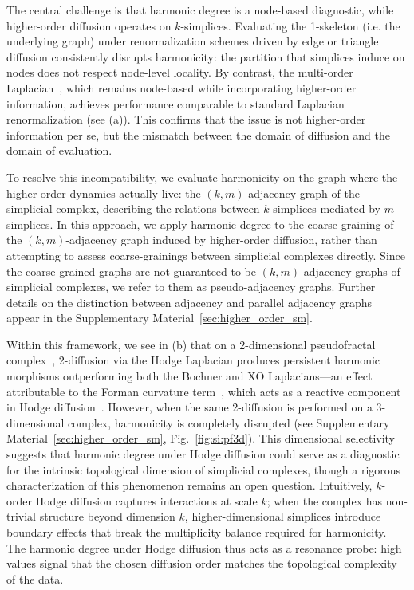 \documentclass[twocolumn,superscriptaddress,tightenlines,aps,prx,floatfix]{revtex4-2}
\begin{document}
\begin{bibunit}
The central challenge is that harmonic degree is a node-based diagnostic, while higher-order diffusion operates on $k$-simplices.
Evaluating the 1-skeleton (i.e. the underlying graph) under renormalization schemes driven by edge or triangle diffusion consistently disrupts harmonicity: the partition that simplices induce on nodes does not respect node-level locality.
By contrast, the multi-order Laplacian~\cite{Lucas_2020}, which remains node-based while incorporating higher-order information, achieves performance comparable to standard Laplacian renormalization (see (a)).
This confirms that the issue is not higher-order information per se, but the mismatch between the domain of diffusion and the domain of evaluation.

To resolve this incompatibility, we evaluate harmonicity on the graph where the higher-order dynamics actually live: the $(k,m)$-adjacency graph of the simplicial complex, describing the relations between $k$-simplices mediated by $m$-simplices.
In this approach, we apply harmonic degree to the coarse-graining of the $(k,m)$-adjacency graph induced by higher-order diffusion, rather than attempting to assess coarse-grainings between simplicial complexes directly.
Since the coarse-grained graphs are not guaranteed to be $(k,m)$-adjacency graphs of simplicial complexes, we refer to them as pseudo-adjacency graphs.
Further details on the distinction between adjacency and parallel adjacency graphs appear in the Supplementary Material~\ref{sec:higher_order_sm}.

Within this framework, we see in (b) that on a 2-dimensional pseudofractal complex~\cite{Dorogovtsev2002pseudofractal}, 2-diffusion via the Hodge Laplacian produces persistent harmonic morphisms outperforming both the Bochner and XO Laplacians---an effect attributable to the Forman curvature term~\cite{Forman2003BochnersMF}, which acts as a reactive component in Hodge diffusion~\cite{nurisso2025higher}. However, when the same 2-diffusion is performed on a 3-dimensional complex, harmonicity is completely disrupted (see Supplementary Material~\ref{sec:higher_order_sm}, Fig.~\ref{fig:si:pf3d}). This dimensional selectivity suggests that harmonic degree under Hodge diffusion could serve as a diagnostic for the intrinsic topological dimension of simplicial complexes, though a rigorous characterization of this phenomenon remains an open question.
Intuitively, $k$-order Hodge diffusion captures interactions at scale $k$; when the complex has non-trivial structure beyond dimension $k$, higher-dimensional simplices introduce boundary effects that break the multiplicity balance required for harmonicity. The harmonic degree under Hodge diffusion thus acts as a resonance probe: high values signal that the chosen diffusion order matches the topological complexity of the data.



\end{bibunit}
\end{document}
